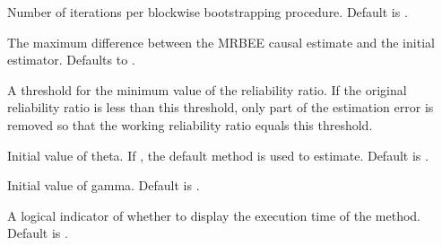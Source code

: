 \documentclass[a4paper]{book}
\begin{document}
\begin{Arguments}
\begin{ldescription}
\item[\code{sampling.iter}] Number of iterations per blockwise bootstrapping procedure. Default is .

\item[\code{maxdiff}] The maximum difference between the MRBEE causal estimate and the initial estimator. Defaults to .

\item[\code{reliability.thres}] A threshold for the minimum value of the reliability ratio. If the original reliability ratio is less than this threshold, only part of the estimation error is removed so that the working reliability ratio equals this threshold.

\item[\code{theta.ini}] Initial value of theta. If , the default method is used to estimate. Default is .

\item[\code{gamma.ini}] Initial value of gamma. Default is .

\item[\code{verbose}] A logical indicator of whether to display the execution time of the method. Default is .
\end{ldescription}
\end{Arguments}
%
\end{document}
